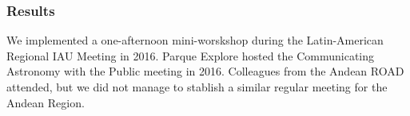 \subsubsection{Results}
We implemented a one-afternoon mini-worskshop during the Latin-American Regional IAU Meeting in 2016.
Parque Explore hosted the Communicating Astronomy with the Public meeting in 2016. Colleagues from the Andean ROAD attended,
but we did not manage to stablish a similar regular meeting for the Andean Region.
